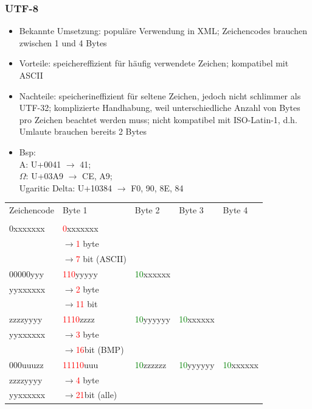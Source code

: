 \documentclass[a4paper,10pt]{article}
\begin{document}
\subsubsection{UTF-8}
\begin{itemize}
\item Bekannte Umsetzung: popul\"are Verwendung in XML; Zeichencodes brauchen zwischen 1 und 4 Bytes
\item Vorteile: speichereffizient f\"ur h\"aufig verwendete Zeichen; kompatibel mit ASCII
\item Nachteile: speicherineffizient f\"ur seltene Zeichen, jedoch nicht schlimmer als UTF-32; komplizierte Handhabung, weil unterschiedliche Anzahl von Bytes pro Zeichen beachtet werden muss; nicht kompatibel mit ISO-Latin-1, d.h. Umlaute brauchen bereits 2 Bytes
\item Bsp: \\ A: U+0041 $\to$ 41; \\ 
$\Omega$: U+03A9 $\to$ CE, A9; \\ 
Ugaritic Delta: U+10384 $\to$ F0, 90, 8E, 84
\end{itemize}
\begin{tabular}{|l|l|l|l|l|}
\hline
Zeichencode&Byte 1&Byte 2&Byte 3&Byte 4\\&&&&\\\hline
0xxxxxxx&\textcolor{red}{0}xxxxxxx&&&\\
&$\to$\textcolor{red}{1} byte&&&\\
&$\to$\textcolor{red}{7} bit (ASCII)&&&\\\hline
00000yyy&\textcolor{red}{110}yyyyy&\textcolor{green}{10}xxxxxx&&\\
yyxxxxxx&$\to$\textcolor{red}{2} byte&&&\\
&$\to$\textcolor{red}{11} bit&&&\\\hline
zzzzyyyy&\textcolor{red}{1110}zzzz&\textcolor{green}{10}yyyyyy&\textcolor{green}{10}xxxxxx&\\
yyxxxxxx&$\to$\textcolor{red}{3} byte&&&\\
&$\to$\textcolor{red}{16}bit (BMP)&&&\\\hline
000uuuzz&\textcolor{red}{11110}uuu&\textcolor{green}{10}zzzzzz&\textcolor{green}{10}yyyyyy&\textcolor{green}{10}xxxxxx\\
zzzzyyyy&$\to$\textcolor{red}{4} byte&&&\\
yyxxxxxx&$\to$\textcolor{red}{21}bit (alle)&&&\\\hline
\end{tabular}
\end{document}
